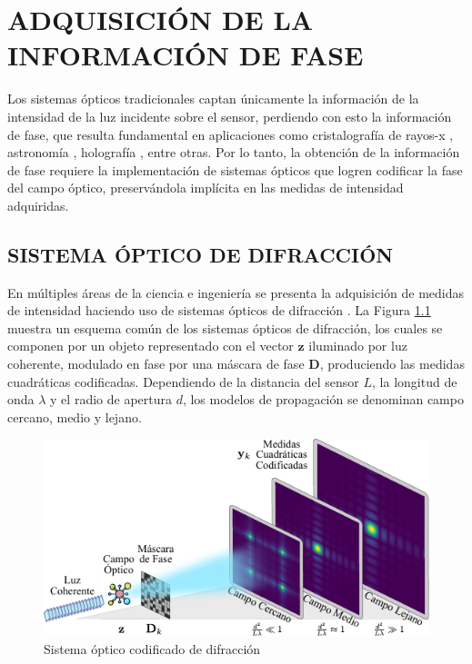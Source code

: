 \chapter{ADQUISICIÓN DE LA INFORMACIÓN DE FASE}

Los sistemas ópticos tradicionales captan únicamente la información de la intensidad de la luz incidente sobre el sensor, perdiendo con esto la información de fase, que resulta fundamental en aplicaciones como cristalografía de rayos-x , astronomía , holografía , entre otras. Por lo tanto, la obtención de la información de fase  requiere la implementación  de sistemas ópticos que logren codificar la fase del campo óptico, preservándola implícita en las medidas de intensidad adquiridas. 
    
\section{SISTEMA ÓPTICO DE DIFRACCIÓN}
En múltiples áreas de la ciencia e ingeniería se presenta la adquisición de medidas de intensidad haciendo uso de sistemas ópticos de difracción . La Figura \ref{fig:difraction_systems} muestra un esquema común de los sistemas ópticos de difracción, los cuales se componen por un objeto representado con el vector $\mathbf{z}$ iluminado por luz coherente, modulado en fase por una máscara de fase $\mathbf{D}$, produciendo las medidas cuadráticas codificadas. Dependiendo de la distancia del sensor $L$, la longitud de onda $\lambda$ y el radio de apertura $d$, los modelos de propagación se denominan campo cercano, medio y lejano.

\begin{figure}[h]
    \centering
    \includegraphics[width=\linewidth]{images/DiffractionSystem.pdf}
    \caption{\hspace{2mm}Sistema óptico codificado de difracción}
    \label{fig:difraction_systems}
\end{figure}

